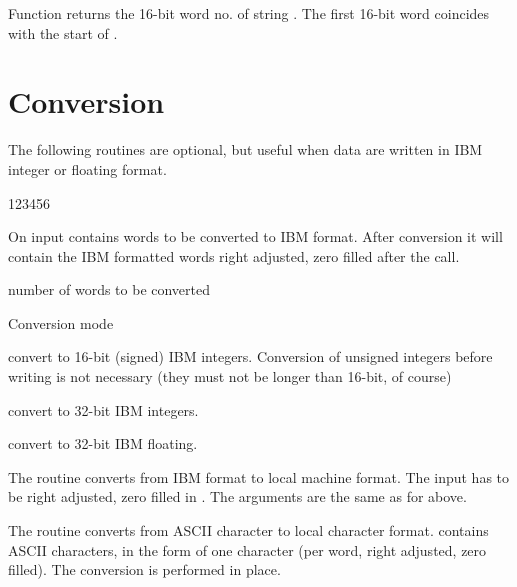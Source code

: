 
Function returns the 16-bit word no.  of string . 
The first 16-bit word coincides with the start of .

\section{Conversion}

The following routines are optional, but useful when data are written
in IBM integer or floating format.


\begin{DLtt}{123456}
\item[{\rm\bf Input/Output buffer:}]
\item[ARRAY] On input contains words to be converted to IBM format.
             After conversion it will contain the IBM formatted 
             words right adjusted, zero filled after the call.
\item[{\rm\bf Input parameters:}]
\item[NW]    number of words to be converted
\item[MODE]  Conversion mode
  \begin{DLtt}{1}
    \item[1:] convert to 16-bit (signed) IBM integers. Conversion of
              unsigned integers before writing is not necessary (they
              must not be longer than 16-bit, of course)
    \item[2:]  convert to 32-bit IBM integers.
    \item[3:]  convert to 32-bit IBM floating.
  \end{DLtt}
\end{DLtt}

 
The routine converts from IBM format to local machine format. The
input has to be right adjusted, zero filled in .
The arguments are the same as for  above. 

 
The routine converts from ASCII character to local character format.
 contains  ASCII characters, 
in the form of one character (per
word, right adjusted, zero filled). The conversion is performed in place.

 
